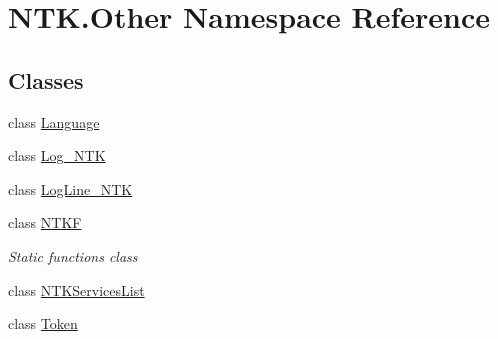 \hypertarget{namespace_n_t_k_1_1_other}{}\section{N\+T\+K.\+Other Namespace Reference}
\label{namespace_n_t_k_1_1_other}
\subsection*{Classes}
\begin{DoxyCompactItemize}
\item 
class \mbox{\hyperlink{class_n_t_k_1_1_other_1_1_language}{Language}}
\item 
class \mbox{\hyperlink{class_n_t_k_1_1_other_1_1_log___n_t_k}{Log\+\_\+\+N\+TK}}
\item 
class \mbox{\hyperlink{class_n_t_k_1_1_other_1_1_log_line___n_t_k}{Log\+Line\+\_\+\+N\+TK}}
\item 
class \mbox{\hyperlink{class_n_t_k_1_1_other_1_1_n_t_k_f}{N\+T\+KF}}
\begin{DoxyCompactList}\small\item\em Static functions class \end{DoxyCompactList}\item 
class \mbox{\hyperlink{class_n_t_k_1_1_other_1_1_n_t_k_services_list}{N\+T\+K\+Services\+List}}
\item 
class \mbox{\hyperlink{class_n_t_k_1_1_other_1_1_token}{Token}}
\end{DoxyCompactItemize}
